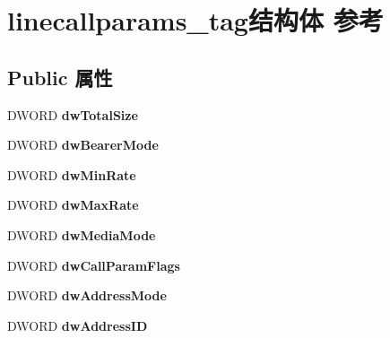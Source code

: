 \hypertarget{structlinecallparams__tag}{}\section{linecallparams\+\_\+tag结构体 参考}
\label{structlinecallparams__tag}
\subsection*{Public 属性}
\begin{DoxyCompactItemize}
\item 
\mbox{\label{structlinecallparams__tag_ad7be8970064a5791c7504157464c628e}} 
D\+W\+O\+RD {\bfseries dw\+Total\+Size}
\item 
\mbox{\label{structlinecallparams__tag_a2cdc56ff376666e3a218e900123ce736}} 
D\+W\+O\+RD {\bfseries dw\+Bearer\+Mode}
\item 
\mbox{\label{structlinecallparams__tag_a3164b28615e4e49c20e2eb9237db96bf}} 
D\+W\+O\+RD {\bfseries dw\+Min\+Rate}
\item 
\mbox{\label{structlinecallparams__tag_a88ecf03bbf454e27100408bac60eb838}} 
D\+W\+O\+RD {\bfseries dw\+Max\+Rate}
\item 
\mbox{\label{structlinecallparams__tag_a325587c96a10f9608cd859ea43d6f97c}} 
D\+W\+O\+RD {\bfseries dw\+Media\+Mode}
\item 
\mbox{\label{structlinecallparams__tag_a4a0eae14695ab08d8c3dd4b939666235}} 
D\+W\+O\+RD {\bfseries dw\+Call\+Param\+Flags}
\item 
\mbox{\label{structlinecallparams__tag_a043e7e95cb66873d0744372d8cedf718}} 
D\+W\+O\+RD {\bfseries dw\+Address\+Mode}
\item 
\mbox{\label{structlinecallparams__tag_a65fa6626283a3bd20d82f709a47eaace}} 
D\+W\+O\+RD {\bfseries dw\+Address\+ID}
\item 
\mbox{\label{structlinecallparams__tag_a58a2a35bce19ea078f7b52a9eb9cbb52}} 

\end{DoxyCompactItemize}
